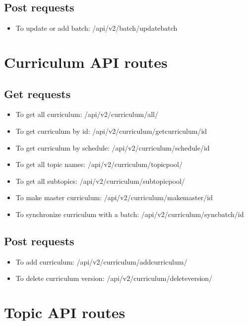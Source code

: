 \subsection{Post requests}
\begin{itemize}
 \item To update or add batch: /api/v2/batch/updatebatch
\end{itemize}

\section{Curriculum API routes}
\subsection{Get requests}
\begin{itemize}
    \item To get all curriculum: /api/v2/curriculum/all/
    \item To get curriculum by id: /api/v2/curriculum/getcurriculum/{id}
    \item To get curriculum by schedule: /api/v2/curriculum/schedule/{id}
    \item To get all topic names: /api/v2/curriculum/topicpool/
    \item To get all subtopics: /api/v2/curriculum/subtopicpool/
    \item To make master curriculum: /api/v2/curriculum/makemaster/{id}
    \item To synchronize curriculum with a batch: /api/v2/curriculum/syncbatch/{id}
\end{itemize}

\subsection{Post requests}
\begin{itemize}
    \item To add curriculum: /api/v2/curriculum/addcurriculum/
    \item To delete curriculum version: /api/v2/curriculum/deleteversion/
\end{itemize}

\section{Topic API routes}
